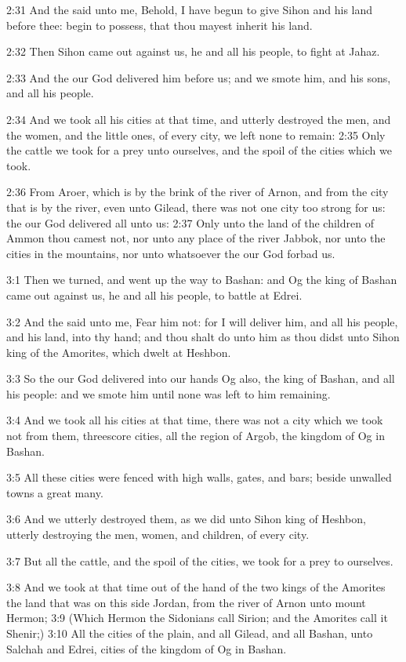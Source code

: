 2:31 And the \LORD said unto me, Behold, I have begun to give Sihon and his land before thee: begin to possess, that thou mayest inherit his land.

2:32 Then Sihon came out against us, he and all his people, to fight at Jahaz.

2:33 And the \LORD our God delivered him before us; and we smote him, and his sons, and all his people.

2:34 And we took all his cities at that time, and utterly destroyed the men, and the women, and the little ones, of every city, we left none to remain: 2:35 Only the cattle we took for a prey unto ourselves, and the spoil of the cities which we took.

2:36 From Aroer, which is by the brink of the river of Arnon, and from the city that is by the river, even unto Gilead, there was not one city too strong for us: the \LORD our God delivered all unto us: 2:37 Only unto the land of the children of Ammon thou camest not, nor unto any place of the river Jabbok, nor unto the cities in the mountains, nor unto whatsoever the \LORD our God forbad us.

3:1 Then we turned, and went up the way to Bashan: and Og the king of Bashan came out against us, he and all his people, to battle at Edrei.

3:2 And the \LORD said unto me, Fear him not: for I will deliver him, and all his people, and his land, into thy hand; and thou shalt do unto him as thou didst unto Sihon king of the Amorites, which dwelt at Heshbon.

3:3 So the \LORD our God delivered into our hands Og also, the king of Bashan, and all his people: and we smote him until none was left to him remaining.

3:4 And we took all his cities at that time, there was not a city which we took not from them, threescore cities, all the region of Argob, the kingdom of Og in Bashan.

3:5 All these cities were fenced with high walls, gates, and bars; beside unwalled towns a great many.

3:6 And we utterly destroyed them, as we did unto Sihon king of Heshbon, utterly destroying the men, women, and children, of every city.

3:7 But all the cattle, and the spoil of the cities, we took for a prey to ourselves.

3:8 And we took at that time out of the hand of the two kings of the Amorites the land that was on this side Jordan, from the river of Arnon unto mount Hermon; 3:9 (Which Hermon the Sidonians call Sirion; and the Amorites call it Shenir;) 3:10 All the cities of the plain, and all Gilead, and all Bashan, unto Salchah and Edrei, cities of the kingdom of Og in Bashan.

